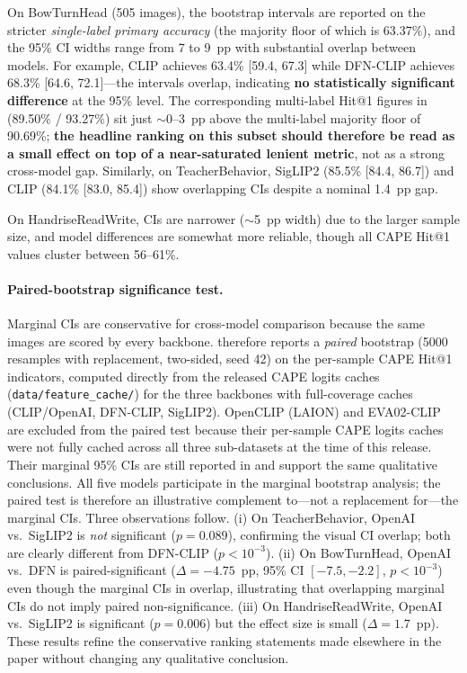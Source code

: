 \documentclass[electronics,article,submit,pdftex,moreauthors]{Definitions/mdpi}
\begin{document}
On BowTurnHead (505 images), the bootstrap intervals are reported on the stricter \emph{single-label primary accuracy} (the majority floor of which is 63.37\%), and the 95\% CI widths range from 7 to 9~pp with substantial overlap between models. For example, CLIP achieves 63.4\% [59.4, 67.3] while DFN-CLIP achieves 68.3\% [64.6, 72.1]---the intervals overlap, indicating \textbf{no statistically significant difference} at the 95\% level. The corresponding multi-label Hit@1 figures in  (89.50\% / 93.27\%) sit just $\sim$0--3~pp above the multi-label majority floor of 90.69\%; \textbf{the headline ranking on this subset should therefore be read as a small effect on top of a near-saturated lenient metric}, not as a strong cross-model gap. Similarly, on TeacherBehavior, SigLIP2 (85.5\% [84.4, 86.7]) and CLIP (84.1\% [83.0, 85.4]) show overlapping CIs despite a nominal 1.4~pp gap.

On HandriseReadWrite, CIs are narrower ($\sim$5~pp width) due to the larger sample size, and model differences are somewhat more reliable, though all CAPE Hit@1 values cluster between 56--61\%.

\paragraph{Paired-bootstrap significance test.} Marginal CIs are conservative for cross-model comparison because the same images are scored by every backbone.  therefore reports a \emph{paired} bootstrap (5000 resamples with replacement, two-sided, seed 42) on the per-sample CAPE Hit@1 indicators, computed directly from the released CAPE logits caches (\texttt{data/feature\_cache/}) for the three backbones with full-coverage caches (CLIP/OpenAI, DFN-CLIP, SigLIP2). OpenCLIP (LAION) and EVA02-CLIP are excluded from the paired test because their per-sample CAPE logits caches were not fully cached across all three sub-datasets at the time of this release. Their marginal 95\% CIs are still reported in  and support the same qualitative conclusions. All five models participate in the marginal bootstrap analysis; the paired test is therefore an illustrative complement to---not a replacement for---the marginal CIs. Three observations follow. (i) On TeacherBehavior, OpenAI vs.\ SigLIP2 is \emph{not} significant ($p=0.089$), confirming the visual CI overlap; both are clearly different from DFN-CLIP ($p<10^{-3}$). (ii) On BowTurnHead, OpenAI vs.\ DFN is paired-significant ($\Delta=-4.75$~pp, 95\% CI $[-7.5,-2.2]$, $p<10^{-3}$) even though the marginal CIs in  overlap, illustrating that overlapping marginal CIs do not imply paired non-significance. (iii) On HandriseReadWrite, OpenAI vs.\ SigLIP2 is significant ($p=0.006$) but the effect size is small ($\Delta=1.7$~pp). These results refine the conservative ranking statements made elsewhere in the paper without changing any qualitative conclusion.
\end{document}
